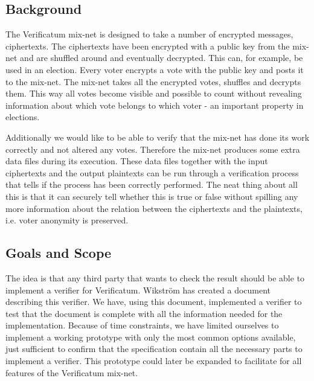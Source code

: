 \subsection{Background}

The Verificatum mix-net is designed to take a number of encrypted
messages, ciphertexts. The ciphertexts have been encrypted with a
public key from the mix-net and are shuffled around and eventually
decrypted. This can, for example, be used in an election. Every voter
encrypts a vote with the public key and posts it to the mix-net. The
mix-net takes all the encrypted votes, shuffles and decrypts
them. This way all votes become visible and possible to count without
revealing information about which vote belongs to which voter - 
an important property in elections.

Additionally we would like to be able to verify that the mix-net has
done its work correctly and not altered any votes. Therefore the
mix-net produces some extra data files during its execution. These
data files together with the input ciphertexts and the output
plaintexts can be run through a verification process that tells if the
process has been correctly performed. The neat thing about all this is
that it can securely tell whether this is true or false without
spilling any more information about the relation between the
ciphertexts and the plaintexts, i.e. voter anonymity is preserved.

\subsection{Goals and Scope}

The idea is that any third party that wants to check the result should
be able to implement a verifier for Verificatum. Wikström has created
a document describing this verifier.\cite{wikstrom1} We have, using
this document, implemented a verifier to test that the document is
complete with all the information needed for the
implementation. Because of time constraints, we have limited ourselves
to implement a working prototype with only the most common options
available, just sufficient to confirm that the specification contain
all the necessary parts to implement a verifier. This prototype could
later be expanded to facilitate for all features of the Verificatum
mix-net.
